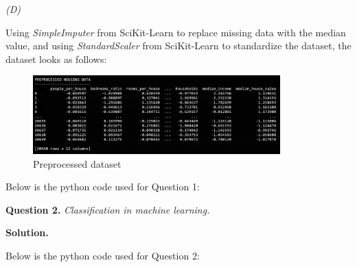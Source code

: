 \documentclass[10pt]{article}
\begin{document}
\smallskip
\textit{(D)}

Using \textit{SimpleImputer} from SciKit-Learn to replace missing data with the median value, and using \textit{StandardScaler} from SciKit-Learn to standardize the dataset, the dataset looks as follows:

\begin{figure}[h]
    \includegraphics[width=0.85\textwidth]{../logs/housing_pre.png}
    \centering
    \caption{Preprocessed dataset}
\end{figure}

Below is the python code used for Question 1:


\textbf{Question 2.} \textit{Classification in machine learning.}

\textbf{Solution.}

Below is the python code used for Question 2:

\end{document}

